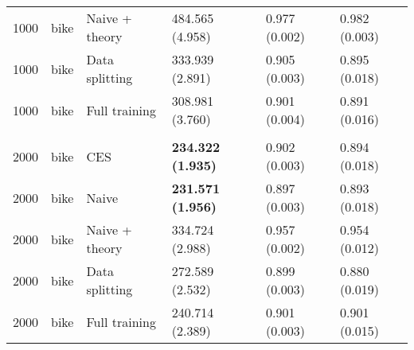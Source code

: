 \begin{tabular}[t]{rlllll}
\hspace{1em}1000 & bike & Naive + theory & 484.565 (4.958) & 0.977 (0.002) & 0.982 (0.003)\\
\hspace{1em}1000 & bike & Data splitting & 333.939 (2.891) & 0.905 (0.003) & 0.895 (0.018)\\
\hspace{1em}1000 & bike & Full training & 308.981 (3.760) & 0.901 (0.004) & 0.891 (0.016)\\
\addlinespace[0.3em]
\multicolumn{6}{l}{\textbf{2000}}\\
\hspace{1em}2000 & bike & CES & \textbf{234.322 (1.935)} & 0.902 (0.003) & 0.894 (0.018)\\
\hspace{1em}2000 & bike & Naive & \textbf{231.571 (1.956)} & 0.897 (0.003) & 0.893 (0.018)\\
\hspace{1em}2000 & bike & Naive + theory & 334.724 (2.988) & 0.957 (0.002) & 0.954 (0.012)\\
\hspace{1em}2000 & bike & Data splitting & 272.589 (2.532) & 0.899 (0.003) & 0.880 (0.019)\\
\hspace{1em}2000 & bike & Full training & 240.714 (2.389) & 0.901 (0.003) & 0.901 (0.015)\\
\bottomrule
\end{tabular}
